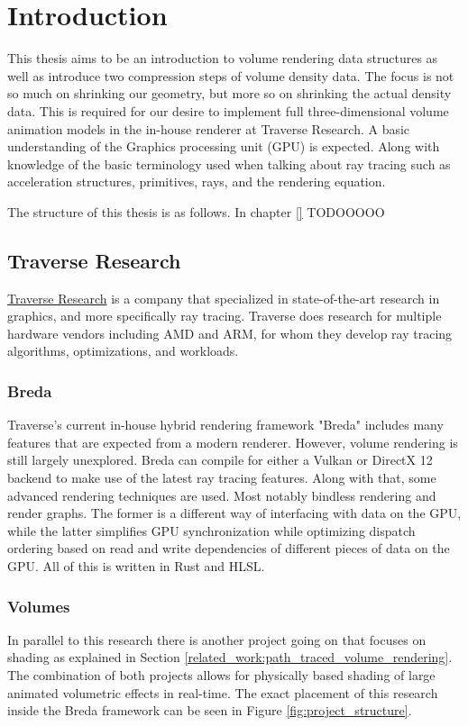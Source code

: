 \section{Introduction} \label{introduction}
This thesis aims to be an introduction to volume rendering data structures as well as introduce two compression steps of volume density data. The focus is not so much on shrinking our geometry, but more so on shrinking the actual density data. This is required for our desire to implement full three-dimensional volume animation models in the in-house renderer at Traverse Research. A basic understanding of the Graphics processing unit (GPU) is expected. Along with knowledge of the basic terminology used when talking about ray tracing such as acceleration structures, primitives, rays, and the rendering equation.

The structure of this thesis is as follows. In chapter \ref{} TODOOOOO


\subsection{Traverse Research} \label{introduction:traverse_research}
\href{https://traverseresearch.nl/}{Traverse Research} is a company that specialized in state-of-the-art research in graphics, and more specifically ray tracing. Traverse does research for multiple hardware vendors including AMD and ARM, for whom they develop ray tracing algorithms, optimizations, and workloads.
\subsubsection{Breda} \label{introduction:traverse_research:breda}
Traverse's current in-house hybrid rendering framework "Breda" includes many features that are expected from a modern renderer. However, volume rendering is still largely unexplored. Breda can compile for either a Vulkan or DirectX 12 backend to make use of the latest ray tracing features. Along with that, some advanced rendering techniques are used. Most notably bindless rendering\cite{BindlessRenderingSetup} and render graphs\cite{RenderGraph101}. The former is a different way of interfacing with data on the GPU, while the latter simplifies GPU synchronization while optimizing dispatch ordering based on read and write dependencies of different pieces of data on the GPU. All of this is written in Rust and HLSL.
\subsubsection{Volumes} \label{introduction:traverse_research:volumes}
In parallel to this research there is another project going on that focuses on shading as explained in Section \ref{related_work:path_traced_volume_rendering}. The combination of both projects allows for physically based shading of large animated volumetric effects in real-time. The exact placement of this research inside the Breda framework can be seen in Figure \ref{fig:project_structure}.


